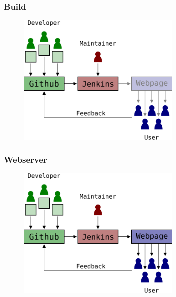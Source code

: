 \begin{frame}
	\frametitle{Build}
	\begin{figure}
		\centering
		\includegraphics[width=0.7\textwidth]{fig/fosa-loop-4.pdf}

	\end{figure}
\end{frame}

\begin{frame}
	\frametitle{Webserver}
	\begin{figure}
		\centering
		\includegraphics[width=0.7\textwidth]{fig/fosa-loop-5.pdf}

	\end{figure}
\end{frame}
